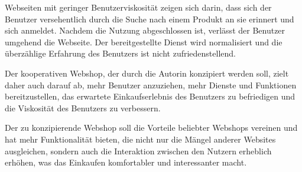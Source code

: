 Webseiten mit geringer Benutzerviskosität zeigen sich darin, dass sich der Benutzer versehentlich durch die Suche nach einem Produkt an sie erinnert und sich anmeldet. Nachdem die Nutzung abgeschlossen ist, verlässt der Benutzer umgehend die Webseite. Der bereitgestellte Dienst wird normalisiert und die \glqq{}überzählige\grqq{} Erfahrung des Benutzers ist nicht zufriedenstellend.\\
\parencite{localytics}

Der kooperativen Webshop, der durch die Autorin konzipiert werden soll, zielt daher auch darauf ab, mehr Benutzer anzuziehen, mehr Dienste und Funktionen bereitzustellen, das erwartete Einkaufserlebnis des Benutzers zu befriedigen und die Viskosität des Benutzers zu verbessern.

Der zu konzipierende Webshop soll die Vorteile beliebter Webshops vereinen und hat mehr Funktionalität bieten, die nicht nur die Mängel anderer Websites ausgleichen, sondern auch die Interaktion zwischen den Nutzern erheblich erhöhen, was das Einkaufen komfortabler und interessanter macht.









